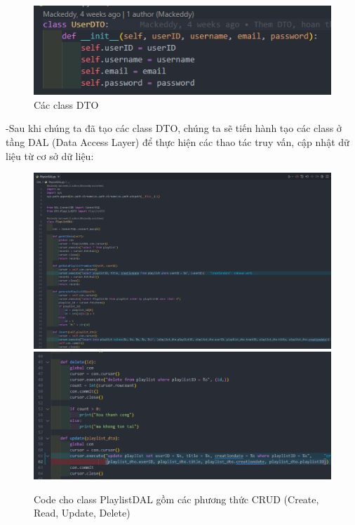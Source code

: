 \documentclass[a4paper]{article}
\begin{document}
\newpage
\begin{flushleft}
	\begin{figure}[h]
		\includegraphics[width=\textwidth]{UserDTO.png}
		\caption{Các class DTO}
	\end{figure}
	-Sau khi chúng ta đã tạo các class DTO, chúng ta sẽ tiến hành tạo các class ở tầng DAL (Data Access Layer) để thực hiện các thao tác truy vấn, cập nhật dữ liệu từ cơ sở dữ liệu:
\end{flushleft}

\begin{figure}[h]
	\centering
	\includegraphics[width=\textwidth]{PlaylistDAL-1.png}
	\includegraphics[width=\textwidth]{PlaylistDAL-2.png}
	\caption{Code cho class PlaylistDAL gồm các phương thức CRUD (Create, Read, Update, Delete)}
\end{figure}
\clearpage
\end{document}
